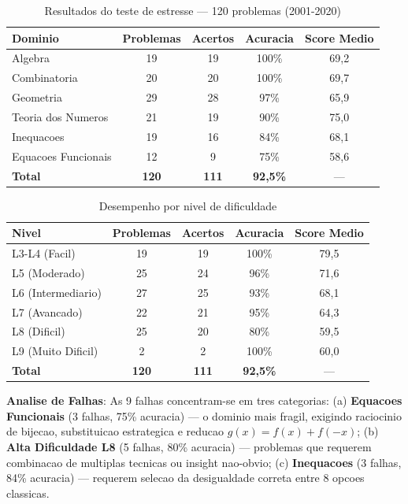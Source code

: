 \documentclass[5p]{elsarticle}
\begin{document}
\begin{table}[H]
  \centering
  \caption{Resultados do teste de estresse — 120 problemas (2001-2020)}
  \label{tab:stress}
  \small
  \begin{tabular}{lcccc}
    \toprule
    \textbf{Dominio} & \textbf{Problemas} & \textbf{Acertos} & \textbf{Acuracia} & \textbf{Score Medio} \\
    \midrule
    Algebra & 19 & 19 & 100\% & 69,2 \\
    Combinatoria & 20 & 20 & 100\% & 69,7 \\
    \rowcolor{greenbg} Geometria & 29 & 28 & 97\% & 65,9 \\
    Teoria dos Numeros & 21 & 19 & 90\% & 75,0 \\
    \rowcolor{yellowbg} Inequacoes & 19 & 16 & 84\% & 68,1 \\
    \rowcolor{redbg} Equacoes Funcionais & 12 & 9 & 75\% & 58,6 \\
    \midrule
    \textbf{Total} & \textbf{120} & \textbf{111} & \textbf{92,5\%} & --- \\
    \bottomrule
  \end{tabular}
\end{table}

\begin{table}[H]
  \centering
  \caption{Desempenho por nivel de dificuldade}
  \label{tab:difficulty}
  \small
  \begin{tabular}{lcccc}
    \toprule
    \textbf{Nivel} & \textbf{Problemas} & \textbf{Acertos} & \textbf{Acuracia} & \textbf{Score Medio} \\
    \midrule
    L3-L4 (Facil) & 19 & 19 & 100\% & 79,5 \\
    L5 (Moderado) & 25 & 24 & 96\% & 71,6 \\
    L6 (Intermediario) & 27 & 25 & 93\% & 68,1 \\
    L7 (Avancado) & 22 & 21 & 95\% & 64,3 \\
    \rowcolor{redbg} L8 (Dificil) & 25 & 20 & 80\% & 59,5 \\
    L9 (Muito Dificil) & 2 & 2 & 100\% & 60,0 \\
    \midrule
    \textbf{Total} & \textbf{120} & \textbf{111} & \textbf{92,5\%} & --- \\
    \bottomrule
  \end{tabular}
\end{table}

\textbf{Analise de Falhas}: As 9 falhas concentram-se em tres categorias:
(a) \textbf{Equacoes Funcionais} (3 falhas, 75\% acuracia) --- o dominio
mais fragil, exigindo raciocinio de bijecao, substituicao estrategica e
reducao $g(x)=f(x)+f(-x)$; (b) \textbf{Alta Dificuldade L8} (5 falhas,
80\% acuracia) --- problemas que requerem combinacao de multiplas tecnicas
ou insight nao-obvio; (c) \textbf{Inequacoes} (3 falhas, 84\% acuracia) ---
requerem selecao da desigualdade correta entre 8 opcoes classicas.
\end{document}
